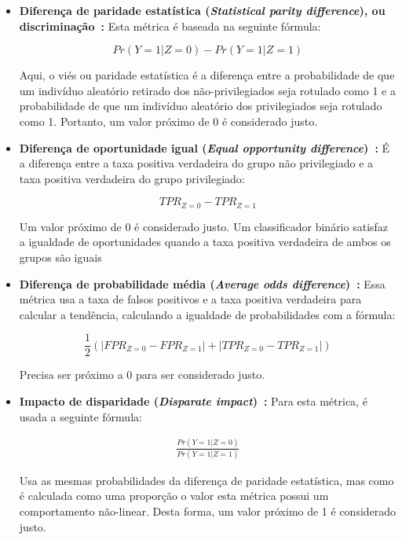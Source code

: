 \documentclass[portugues]{ic-tese}
\begin{document}
\begin{itemize}
\item \textbf{Diferença de paridade estatística (\textit{Statistical parity difference}), ou discriminação~\citep{Zemel_2013}:} Esta métrica é baseada na seguinte fórmula:

\begin{equation}
Pr(Y=1|Z=0)-Pr(Y=1|Z=1)
\end{equation}
 
Aqui, o viés ou paridade estatística é a diferença entre a probabilidade de que um indivíduo aleatório retirado dos não-privilegiados seja rotulado como 1 e a probabilidade de que um indivíduo aleatório dos privilegiados seja rotulado como 1. Portanto, um valor próximo de 0 é considerado justo.

\item \textbf{Diferença de oportunidade igual (\textit{Equal opportunity difference})~\citep{Biswas_2020}:} É a diferença entre a taxa positiva verdadeira do grupo não privilegiado e a taxa positiva verdadeira do grupo privilegiado:

\begin{equation}
TPR_{Z=0} - TPR_{Z=1}
\end{equation}
 
Um valor próximo de 0 é considerado justo. Um classificador binário satisfaz a igualdade de oportunidades quando a taxa positiva verdadeira de ambos os grupos são iguais~\citep{Hardt_2016}

\item \textbf{Diferença de probabilidade média (\textit{Average odds difference})~\citep{Biswas_2020}:} Essa métrica usa a taxa de falsos positivos e a taxa positiva verdadeira para calcular a tendência, calculando a igualdade de probabilidades com a fórmula:

\begin{equation}
\frac{1}{2}(|FPR_{Z=0} - FPR_{Z=1}|+|TPR_{Z=0} - TPR_{Z=1}|)
\end{equation}
 
Precisa ser próximo a 0 para ser considerado justo.

\item \textbf{Impacto de disparidade (\textit{Disparate impact})~\citep{Biswas_2020}:} Para esta métrica, é usada a seguinte fórmula:

\begin{align*}
\frac{Pr(Y=1|Z=0)}{Pr(Y=1|Z=1)}
\end{align*}

Usa as mesmas probabilidades da diferença de paridade estatística, mas como é calculada como uma proporção o valor esta métrica possui um comportamento não-linear. Desta forma, um valor próximo de 1 é considerado justo.


\end{itemize}
\end{document}
